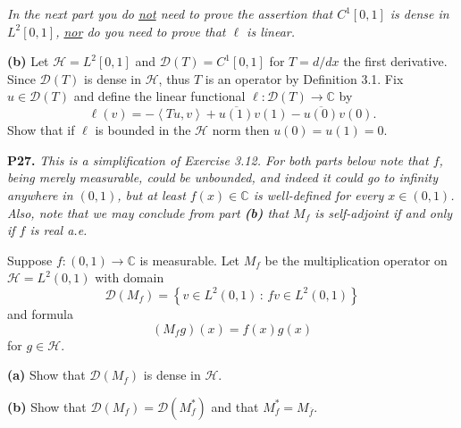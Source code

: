 \documentclass[12pt]{amsart}
\newcommand{\cD}{\mathcal{D}}
\newcommand{\cH}{\mathcal{H}}
\newcommand{\CC}{\mathbb{C}}
\newcommand{\ip}[2]{\ensuremath{\left<#1,#2\right>}}
\newcommand{\prob}[1]{\bigskip\noindent\textbf{#1.}\quad }
\newcommand{\epart}[1]{\medskip\noindent\textbf{(#1)}\quad }
\begin{document}
\clearpage\newpage
\noindent \emph{In the next part you do \underline{not} need to prove the assertion that $C^1[0,1]$ is dense in $L^2[0,1]$, \underline{nor} do you need to prove that $\ell$ is linear.}

\epart{b} Let $\cH=L^2[0,1]$ and $\cD(T) = C^1[0,1]$ for $T = d/dx$ the first derivative.  Since $\cD(T)$ is dense in $\cH$, thus $T$ is an operator by Definition 3.1.  Fix $u\in\cD(T)$ and define the linear functional $\ell:\cD(T)\to\CC$ by
	$$\ell(v) = - \ip{Tu}{v} + \overline{u(1)} v(1) - \overline{u(0)} v(0).$$
Show that if $\ell$ is bounded in the $\cH$ norm then $u(0)=u(1)=0$.


\prob{P27}  \emph{This is a simplification of Exercise 3.12.  For both parts below note that $f$, being merely measurable, could be unbounded, and indeed it could go to infinity anywhere in $(0,1)$, but at least $f(x)\in\CC$ is well-defined for every $x\in(0,1)$.  Also, note that we may conclude from part \emph{\textbf{(b)}} that $M_f$ is self-adjoint if and only if $f$ is real a.e.}

\medskip \noindent Suppose $f:(0,1)\to\CC$ is measurable.  Let $M_f$ be the multiplication operator on $\cH=L^2(0,1)$ with domain
	$$\cD(M_f) = \left\{v \in L^2(0,1)\,:\,fv \in L^2(0,1)\right\}$$
and formula
	$$(M_f g)(x) = f(x) g(x)$$
for $g\in\cH$.

\epart{a}  Show that $\cD(M_f)$ is dense in $\cH$.

\epart{b}  Show that $\cD(M_f) = \cD(M_f^*)$ and that $M_f^* = M_{\overline{f}}$.
\end{document}
